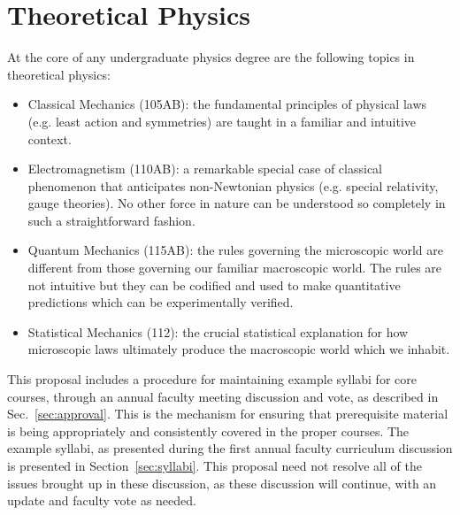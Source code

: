 \documentclass[12pt]{article}
\begin{document}
\section{Theoretical Physics}
\label{sec:theory}

At the core of any undergraduate physics degree are the following
topics in theoretical physics:
\begin{itemize}
\item Classical Mechanics (105AB): the fundamental principles of physical laws
  (e.g. least action and symmetries) are taught in a familiar and
  intuitive context. 
\item Electromagnetism (110AB): a remarkable special case of classical
  phenomenon that anticipates non-Newtonian physics (e.g. special
  relativity, gauge theories).  No other force in nature can be understood so
  completely in such a straightforward fashion.  
\item Quantum Mechanics (115AB): the rules governing the microscopic world are
  different from those governing our familiar macroscopic world.  The
  rules are not intuitive but they can be codified and used to make
  quantitative predictions which can be experimentally verified.
\item Statistical Mechanics (112): the crucial statistical explanation for how
  microscopic laws ultimately produce the macroscopic world which we inhabit.
\end{itemize}

This proposal includes a procedure for maintaining example syllabi for
core courses, through an annual faculty meeting discussion and vote,
as described in Sec.~\ref{sec:approval}.  This is the mechanism for
ensuring that prerequisite material is being appropriately and
consistently covered in the proper courses.  The example syllabi, as
presented during the first annual faculty curriculum discussion is
presented in Section~\ref{sec:syllabi}.  This proposal need not
resolve all of the issues brought up in these discussion, as these
discussion will continue, with an update and faculty vote as
needed.
\end{document}
